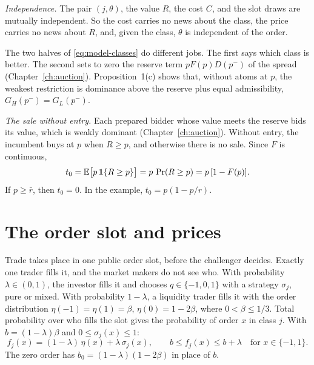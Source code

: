 \emph{Independence.} The pair \((j,\theta)\), the value \(R\), the cost \(C\), and the slot draws are mutually independent.
So the cost carries no news about the class, the price carries no news about \(R\), and, given the class, \(\theta\) is independent of the order.

\begin{watchout}
The two halves of \eqref{eq:model-classes} do different jobs. The first says which class is better.
The second sets to zero the reserve term \(pF(p)D(p^-)\) of the spread (Chapter~\ref{ch:auction}).
Proposition~1(c) shows that, without atoms at \(p\), the weakest restriction is dominance above the reserve plus equal admissibility, \(G_H(p^-)=G_L(p^-)\).
\end{watchout}

\emph{The sale without entry.} Each prepared bidder whose value meets the reserve bids its value, which is weakly dominant (Chapter~\ref{ch:auction}).
Without entry, the incumbent buys at \(p\) when \(R\ge p\), and otherwise there is no sale. Since \(F\) is continuous,
\begin{equation}\label{eq:model-t0}
t_0=\mathbb{E}\bigl[p\,\mathbf{1}\{R\ge p\}\bigr]=p\,\Pr(R\ge p)=p\,[1-F(p)].
\end{equation}
If \(p\ge\bar r\), then \(t_0=0\). In the example, \(t_0=p(1-p/r)\).

\section{The order slot and prices}\label{sec:model-slot}

Trade takes place in one public order slot, before the challenger decides. Exactly one trader fills it, and the market makers do not see who.
With probability \(\lambda\in(0,1)\), the investor fills it and chooses \(q\in\{-1,0,1\}\) with a strategy \(\sigma_j\), pure or mixed.
With probability \(1-\lambda\), a liquidity trader fills it with the order distribution \(\eta(-1)=\eta(1)=\beta\), \(\eta(0)=1-2\beta\), where \(0<\beta\le1/3\).
Total probability over who fills the slot gives the probability of order \(x\) in class \(j\).
With \(b=(1-\lambda)\beta\) and \(0\le\sigma_j(x)\le1\):
\begin{equation}\label{eq:model-orderprob}
f_j(x)=(1-\lambda)\,\eta(x)+\lambda\,\sigma_j(x),\qquad b\le f_j(x)\le b+\lambda\quad\text{for }x\in\{-1,1\}.
\end{equation}
The zero order has \(b_0=(1-\lambda)(1-2\beta)\) in place of \(b\).

